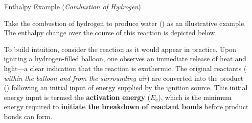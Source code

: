 \documentclass[10pt]{article}
\begin{document}
    \begin{core}{Enthalpy Example (\textit{Combustion of Hydrogen})}

      Take the combustion of hydrogen to produce water () as an illustrative example. The enthalpy change over the course of this reaction is depicted below.


      To build intuition, consider the reaction as it would appear in practice. Upon igniting a hydrogen-filled balloon, one observes an immediate release of heat and light---a clear indication that the reaction is exothermic. The original reactants (\textit{ within the balloon and  from the surrounding air}) are converted into the product () following an initial input of energy supplied by the ignition source. This initial energy input is termed the \textbf{activation energy} ($E_a$), which is the minimum energy required to \textbf{initiate the breakdown of reactant bonds} before product bonds can form.


\end{core}
\end{document}
